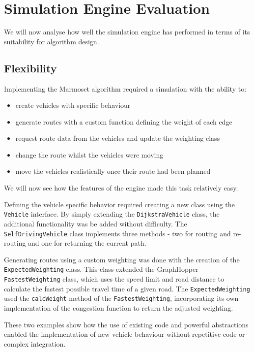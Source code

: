 \documentclass[ %
                    author={Alexander Hill},
                supervisor={Dr. Benjamin Sach},
                    degree={MEng},
                     title={MARMOSET},
                  subtitle={Multi-Agent Route Management using Online Simulation for Efficient Transportation},
                      type={research},
                      year={2016} ]{dissertation}
\begin{document}
\section{Simulation Engine Evaluation}

We will now analyse how well the simulation engine has performed in terms
of its suitability for algorithm design.

\subsection{Flexibility}

Implementing the Marmoset algorithm required a simulation with the ability to:

\begin{itemize}
    \item create vehicles with specific behaviour
    \item generate routes with a custom function defining the weight of each edge
    \item request route data from the vehicles and update the weighting class
    \item change the route whilst the vehicles were moving
    \item move the vehicles realistically once their route had been planned
\end{itemize}

We will now see how the features of the engine made this task relatively easy.

Defining the vehicle specific behavior required creating a new class using the
\texttt{Vehicle} interface. By simply extending the \texttt{DijkstraVehicle}
class, the additional functionality was be added without difficulty. The
\texttt{SelfDrivingVehicle} class implements three methods - two for routing and
re-routing and one for returning the current path.

Generating routes using a custom weighting was done with the creation of the
\texttt{ExpectedWeighting} class. This class extended the GraphHopper
\texttt{FastestWeighting} class, which uses the speed limit and road distance to
calculate the fastest possible travel time of a given road. The
\texttt{ExpectedWeighting} used the \texttt{calcWeight} method of the
\texttt{FastestWeighting}, incorporating its own implementation of the
congestion function to return the adjusted weighting.

These two examples show how the use of existing code and powerful abstractions
enabled the implementation of new vehicle behaviour without repetitive code or
complex integration.
\end{document}
